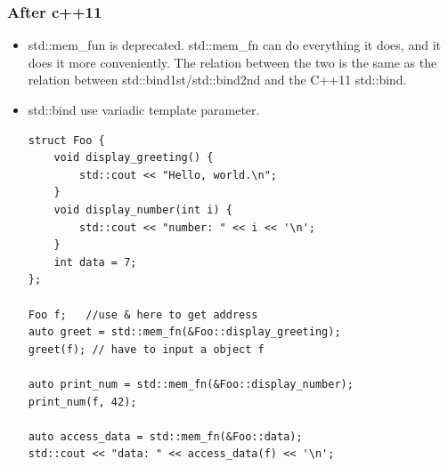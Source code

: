 \documentclass[a4paper,11pt,twoside]{book}
\begin{document}
\subsubsection{After c++11}
\begin{itemize}
	\item std::mem\_fun is deprecated. std::mem\_fn can do everything it does, and it does it more conveniently. The relation between the two is the same as the relation between std::bind1st/std::bind2nd and the C++11 std::bind. 
	
	\item std::bind use variadic template parameter.
	
\begin{lstlisting}
struct Foo {
	void display_greeting() {
		std::cout << "Hello, world.\n";
	}
	void display_number(int i) {
		std::cout << "number: " << i << '\n';
	}
	int data = 7;
};

Foo f;   //use & here to get address
auto greet = std::mem_fn(&Foo::display_greeting);
greet(f); // have to input a object f

auto print_num = std::mem_fn(&Foo::display_number);
print_num(f, 42);

auto access_data = std::mem_fn(&Foo::data);
std::cout << "data: " << access_data(f) << '\n';
\end{lstlisting}

\end{itemize}
\end{document}
